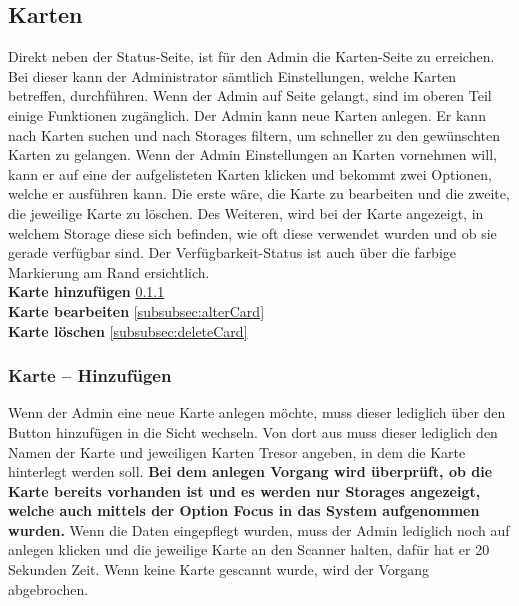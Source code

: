 \newpage

\subsection{Karten} 
Direkt neben der Status-Seite, ist für den Admin die Karten-Seite zu erreichen. Bei dieser kann der Administrator sämtlich Einstellungen, welche Karten betreffen, durchführen. Wenn der Admin auf Seite gelangt, sind im oberen Teil einige Funktionen zugänglich. Der Admin kann neue Karten anlegen. Er kann nach Karten suchen und nach Storages filtern, um schneller zu den gewünschten Karten zu gelangen. Wenn der Admin Einstellungen an Karten vornehmen will, kann er auf eine der aufgelisteten Karten klicken und bekommt zwei Optionen, welche er ausführen kann. Die erste wäre, die Karte zu bearbeiten und die zweite, die jeweilige Karte zu löschen. Des Weiteren, wird bei der Karte angezeigt, in welchem Storage diese sich befinden, wie oft diese verwendet wurden und ob sie gerade verfügbar sind. Der Verfügbarkeit-Status ist auch über die farbige Markierung am Rand ersichtlich.
\vspace{3cm}
\\
\vspace{3cm}
\textbf{Karte hinzufügen} \ref{subsubsec:addCard}
\\
\vspace{3cm}
\textbf{Karte bearbeiten} \ref{subsubsec:alterCard}
\\
\vspace{3cm}
\textbf{Karte löschen} \ref{subsubsec:deleteCard}

\newpage

\subsubsection{Karte – Hinzufügen} \label{subsubsec:addCard}
Wenn der Admin eine neue Karte anlegen möchte, muss dieser lediglich über den Button hinzufügen in die Sicht wechseln. Von dort aus muss dieser lediglich den Namen der Karte und jeweiligen Karten Tresor angeben, in dem die Karte hinterlegt werden soll. \textbf{Bei dem anlegen Vorgang wird überprüft, ob die Karte bereits vorhanden ist und es werden nur Storages angezeigt, welche auch mittels der Option Focus in das System aufgenommen wurden.} Wenn die Daten eingepflegt wurden, muss der Admin lediglich noch auf anlegen klicken und die jeweilige Karte an den Scanner halten, dafür hat er 20 Sekunden Zeit. Wenn keine Karte gescannt wurde, wird der Vorgang abgebrochen.

